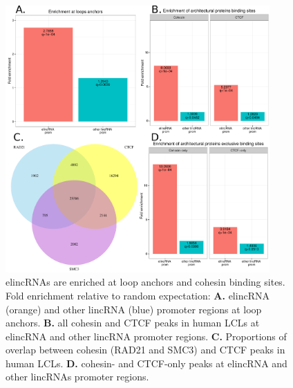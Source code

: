 \documentclass[11pt,a4paper]{report}
\begin{document}
\begin{figure}[ht]
	\includegraphics[width=0.9\textwidth]{Figures/2_enrich_anchor_prot.pdf}
	\caption{elincRNAs are enriched at loop anchors and cohesin binding sites. Fold enrichment relative to random expectation: \textbf{A.} elincRNA (orange) and other lincRNA (blue) promoter regions at loop anchors. \textbf{B.} all cohesin and CTCF peaks in human LCLs at elincRNA and other lincRNA promoter regions. \textbf{C.} Proportions of overlap between cohesin (RAD21 and SMC3) and CTCF peaks in human LCLs. \textbf{D.} cohesin- and CTCF-only peaks at elincRNA and other lincRNAs promoter regions.}
	\label{enrich_elinc}
\end{figure}
\end{document}
